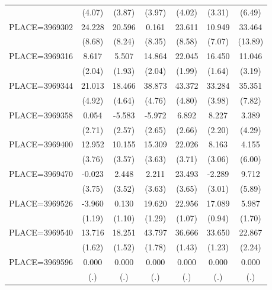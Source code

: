 {\begin{tabular}{l*{6}{c}}
                    &      (4.07)&      (3.87)&      (3.97)&      (4.02)&      (3.31)&      (6.49)\\
PLACE=3969302       &      24.228&      20.596&       0.161&      23.611&      10.949&      33.464\\
                    &      (8.68)&      (8.24)&      (8.35)&      (8.58)&      (7.07)&     (13.89)\\
PLACE=3969316       &       8.617&       5.507&      14.864&      22.045&      16.450&      11.046\\
                    &      (2.04)&      (1.93)&      (2.04)&      (1.99)&      (1.64)&      (3.19)\\
PLACE=3969344       &      21.013&      18.466&      38.873&      43.372&      33.284&      35.351\\
                    &      (4.92)&      (4.64)&      (4.76)&      (4.80)&      (3.98)&      (7.82)\\
PLACE=3969358       &       0.054&      -5.583&      -5.972&       6.892&       8.227&       3.389\\
                    &      (2.71)&      (2.57)&      (2.65)&      (2.66)&      (2.20)&      (4.29)\\
PLACE=3969400       &      12.952&      10.155&      15.309&      22.026&       8.163&       4.155\\
                    &      (3.76)&      (3.57)&      (3.63)&      (3.71)&      (3.06)&      (6.00)\\
PLACE=3969470       &      -0.023&       2.448&       2.211&      23.493&      -2.289&       9.712\\
                    &      (3.75)&      (3.52)&      (3.63)&      (3.65)&      (3.01)&      (5.89)\\
PLACE=3969526       &      -3.960&       0.130&      19.620&      22.956&      17.089&       5.987\\
                    &      (1.19)&      (1.10)&      (1.29)&      (1.07)&      (0.94)&      (1.70)\\
PLACE=3969540       &      13.716&      18.251&      43.797&      36.666&      33.650&      22.867\\
                    &      (1.62)&      (1.52)&      (1.78)&      (1.43)&      (1.23)&      (2.24)\\
PLACE=3969596       &       0.000&       0.000&       0.000&       0.000&       0.000&       0.000\\
                    &         (.)&         (.)&         (.)&         (.)&         (.)&         (.)\\

\end{tabular}}
